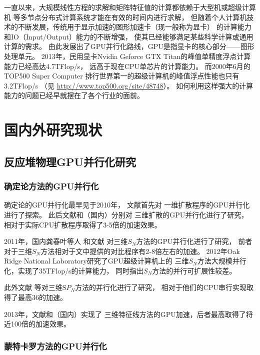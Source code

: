 一直以来，大规模线性方程的求解和矩阵特征值的计算都依赖于大型机或超级计算机
等多节点分布式计算系统才能在有效的时间内进行求解，
但随着个人计算机技术的不断发展，传统用于显示加速的图形加速卡（现一般称为显卡）
的计算能力和IO（Input/Output）能力的不断增强，
使其已经能够满足某些科学计算或通用计算的需求。
由此发展出了GPU并行化路线，GPU是指显卡的核心部分——图形处理单元。
2013年，民用显卡Nvidia Geforce GTX Titan的峰值单精度浮点计算能力已经高达4.7TFlop/s，
远高于现在CPU单芯片的计算能力。
而2000年6月的TOP500 Super Computer \cite{meuer2001top500}
排行世界第一的超级计算机的峰值浮点性能也只有3.2TFlop/s
（见 \url{http://www.top500.org/site/48748}）。
如何利用这样强大的计算能力的问题已经早就摆在了各个行业的面前。

\section{国内外研究现状}

\subsection{反应堆物理GPU并行化研究}
\subsubsection{确定论方法的GPU并行化}

确定论的GPU并行化最早见于2010年，
文献首先对
一维扩散程序的GPU并行化进行了探索。%
此后文献和（国内）分别对
三维扩散的GPU并行化进行了研究，
相对于实际CPU扩散程序取得了3-5倍的加速效果。

2011年，国内龚春叶等人\cite{gong2011gpu,gong2012particle,gongyechun}
和文献
对三维$S_N$方法的GPU并行化进行了研究，
前者对于三维$S_N$方法相对于文中提供的对比程序有2-8倍左右的加速。
2012年Oak Ridge National Laboratory研究了GPU超级计算机上的
三维$S_N$方法大规模并行化，实现了35TFlop/s的计算能力，
同时指出$S_N$方法的并行可扩展性较差。\cite{baker2012high}

此外文献
等对三维$\mathrm{S}P_N$方法的并行化进行了研究，
相对于他们的CPU串行实现取得了最高36的加速。

2013年，文献和（国内）实现了
三维特征线方法的GPU加速，后者最高取得了将近100倍的加速效果。

\subsubsection{蒙特卡罗方法的GPU并行化}

